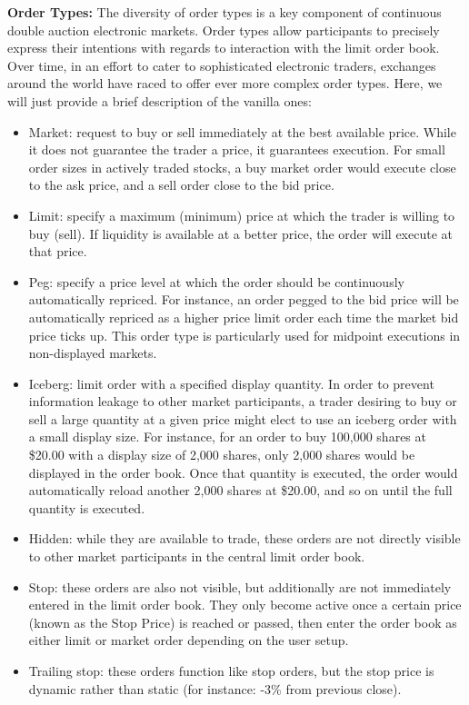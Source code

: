 \noindent\textbf{Order Types:} The diversity of order types is a key component of continuous double auction electronic markets. Order types allow participants to precisely express their intentions with regards to interaction with the limit order book. Over time, in an effort to cater to sophisticated electronic traders, exchanges around the world have raced to offer ever more complex order types. Here, we will just provide a brief description of the vanilla ones:
\begin{itemize}
\item  Market: request to buy or sell immediately at the best available price. While it does not guarantee the trader a price, it guarantees execution. For small order sizes in actively traded stocks, a buy market order would execute close to the ask price, and a sell order close to the bid price.
\item  Limit: specify a maximum (minimum) price at which the trader is willing to buy (sell). If liquidity is available at a better price, the order will execute at that price.
\item  Peg: specify a price level at which the order should be continuously automatically repriced. For instance, an order pegged to the bid price will be automatically repriced as a higher price limit order each time the market bid price ticks up. This order type is particularly used for midpoint executions in non-displayed markets.
\item  Iceberg: limit order with a specified display quantity. In order to prevent information leakage to other market participants, a trader desiring to buy or sell a large quantity at a given price might elect to use an iceberg order with a small display size. For instance, for an order to buy 100,000 shares at \$20.00 with a display size of 2,000 shares, only 2,000 shares would be displayed in the order book. Once that quantity is executed, the order would automatically reload another 2,000 shares at \$20.00, and so on until the full quantity is executed.
\item  Hidden: while they are available to trade, these orders are not directly visible to other market participants in the central limit order book. 
\item  Stop: these orders are also not visible, but additionally are not immediately entered in the limit order book. They only become active once a certain price (known as the Stop Price) is reached or passed, then enter the order book as either limit or market order depending on the user setup.
\item  Trailing stop: these orders function like stop orders, but the stop price is dynamic rather than static (for instance: -3\% from previous close).

\end{itemize}
